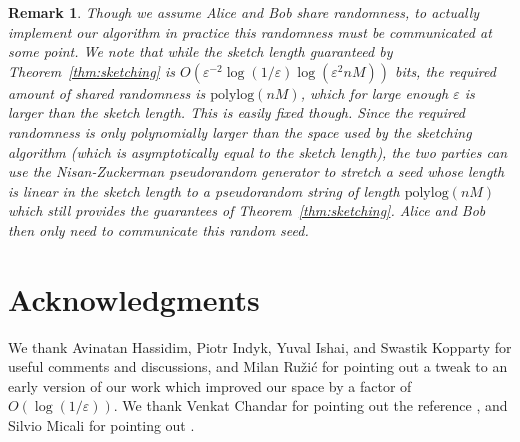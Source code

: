\documentclass[letterpaper,11pt]{article}
\newcommand{\polylog}{{\mathrm{polylog}}}
\newcommand{\eps}{\varepsilon}
\newcommand{\Theorem}[1]{Theorem~\ref{thm:#1}}
\newtheorem{remark}[theorem]{Remark}
\begin{document}
\begin{remark}
Though we assume Alice and Bob share randomness, to actually implement
our algorithm in practice this randomness must be communicated at some
point.
We note that while the sketch length guaranteed by \Theorem{sketching}
is $O(\eps^{-2}\log(1/\eps)\log(\eps^2 nM))$ bits, the required amount
of shared randomness is $\polylog(nM)$, which for large enough $\eps$
is larger than the sketch length.  This is easily fixed
though. Since the required randomness is only polynomially larger than
the space used by the sketching algorithm (which is asymptotically equal
to the sketch length), the two parties can use the Nisan-Zuckerman
pseudorandom
generator \cite{NisanZu96} to stretch a seed whose length is linear
  in the sketch length to a pseudorandom string of length
$\polylog(nM)$ which still provides the guarantees of
\Theorem{sketching}.  Alice and Bob then only need to communicate this
random seed.
\end{remark}

\section*{Acknowledgments}
We thank Avinatan Hassidim, Piotr Indyk, Yuval Ishai, and Swastik
Kopparty for useful comments and discussions, and Milan Ru\v{z}i\'{c}
for pointing out a tweak to
an early version of our work which improved our space by a factor of
$O(\log(1/\eps))$. We thank Venkat Chandar for pointing out the
reference \cite{Wyner74}, and Silvio Micali for pointing out
\cite{BM84}.




\end{document}

